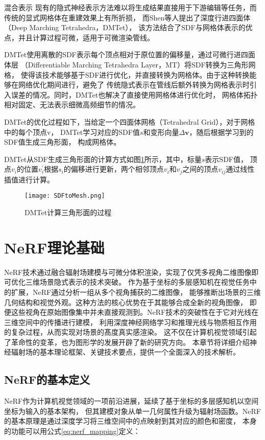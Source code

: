  混合表示
现有的隐式神经表示方法难以将生成结果直接用于下游编辑等任务，而传统的显式网格体在重建效果上有所折损，
而Shen等人\cite{shen2021deep}提出了深度行进四面体（Deep Marching Tetrahedra，DMTet），
该方法结合了SDF与网格体表示的优点，并且计算过程可微，适用于可微渲染管线。

DMTet使用离散的SDF表示每个顶点相对于原位置的偏移量，通过可微行进四面体层
（Differentiable Marching Tetrahedra Layer，MT）将SDF转换为三角形网格，
使得该技术能够基于SDF进行优化，并直接转换为网格体。由于这种转换能够在网络优化期间进行，避免了
传统隐式表示在管线后额外转换为网格表示时引入误差的情况。同时，DMTet也解决了直接使用网格体进行优化时，
网格体拓扑相对固定、无法表示细微高频细节的情况。

DMTet的优化过程如下，当给定一个四面体网格（Tetrahedral Grid），对于网格中的每个顶点v，
DMTet学习对应的SDF值$s$和变形向量$\Delta\mathbf{v}$，随后根据学习到的SDF值生成三角形面，
构成网格体。

DMTet从SDF生成三角形面的计算方式如图\ref{fig:dmtet_calc}所示，其中，标量$s$表示SDF值，
顶点$v_i$的位置$v_i^\prime$根据$s_i$的偏移进行更新，两个相邻顶点$v_i$和$v_j$之间的顶点$v_{ij}$通过线性插值进行计算。

\begin{figure}[htbp]
  \centering
  \texttt{[image: SDFtoMesh.png]}
  \caption{DMTet计算三角形面的过程}
  \label{fig:dmtet_calc}
\end{figure}

\section{NeRF理论基础}

NeRF技术通过融合辐射场建模与可微分体积渲染，实现了仅凭多视角二维图像即可优化三维场景隐式表示的技术突破。
作为基于坐标的多层感知机在视觉任务中的扩展，NeRF通过分析一组从多个视角捕获的二维图像，
能够推断出场景的三维几何结构和视觉外观。这种方法的核心优势在于其能够合成全新的视角图像，
即便这些视角在原始图像集中并未直接观测到。NeRF技术的突破性在于它对光线在三维空间中的传播进行建模，
利用深度神经网络学习和推理光线与物质相互作用的复杂过程，从而实现对场景的髙度真实感渲染。
这不仅在计算机视觉领域引起了革命性的变革，也为图形学的发展开辟了新的研究方向。
本章节将详细介绍神经辐射场的基本理论框架、关键技术要点，提供一个全面深入的技术解析。

\subsection{NeRF的基本定义}
NeRF作为计算机视觉领域的一项前沿进展，延续了基于坐标的多层感知机以空间坐标为输入的基本架构，
但其建模对象从单一几何属性升级为辐射场函数。NeRF的基本原理是通过深度学习将三维空间中的点映射到其对应的颜色和密度，
本身的功能可以用公式\eqref{eq:nerf_mapping}定义：

